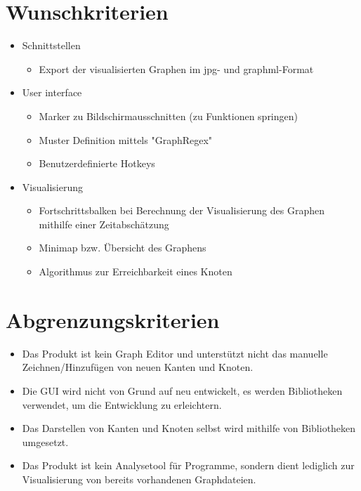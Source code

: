 \section{Wunschkriterien}

\begin{itemize}
\item Schnittstellen
\begin{itemize}
\item Export der visualisierten Graphen im \gls{jpg}- und \gls{graphml}-Format
\end{itemize}
\item User interface
\begin{itemize}
\item Marker zu Bildschirmausschnitten (zu Funktionen springen)
\item Muster Definition mittels "GraphRegex"
\item Benutzerdefinierte Hotkeys
\end{itemize}
\item Visualisierung
\begin{itemize}
\item Fortschrittsbalken bei Berechnung der Visualisierung des Graphen mithilfe einer Zeitabschätzung
\item Minimap bzw. Übersicht des Graphens
\item Algorithmus zur Erreichbarkeit eines Knoten
\end{itemize}
\end{itemize}

\section{Abgrenzungskriterien}

\begin{itemize}
\item Das Produkt ist kein Graph Editor und unterstützt nicht das manuelle Zeichnen/Hinzufügen von neuen Kanten und Knoten.
\item Die GUI wird nicht von Grund auf neu entwickelt, es werden Bibliotheken verwendet, um die Entwicklung zu erleichtern. 
\item Das Darstellen von Kanten und Knoten selbst wird mithilfe von Bibliotheken umgesetzt.
\item Das Produkt ist kein Analysetool für Programme, sondern dient lediglich zur Visualisierung von bereits vorhandenen Graphdateien.
\end{itemize}